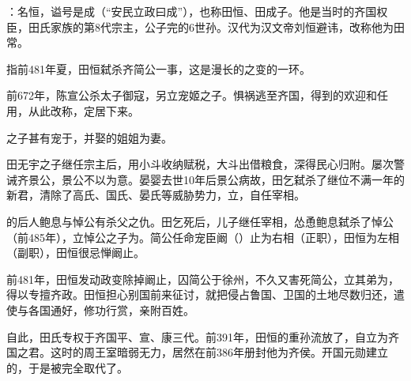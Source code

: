 {
\item {}：名恒，谥号是成（“安民立政曰成”），也称田恒、田成子。他是当时的齐国权臣，田氏家族的第8代宗主，公子完的6世孙。汉代为汉文帝刘恒避讳，改称他为田常。

指前481年夏，田恒弑杀齐简公一事，这是漫长的之变的一环。
\begin{lyenumerate}
\item 前672年，陈宣公杀太子御寇，另立宠姬之子。惧祸逃至齐国，得到的欢迎和任用，从此改称，定居下来。
\item {}之子甚有宠于，并娶的姐姐为妻。%
\item 田无宇之子继任宗主后，用小斗收纳赋税，大斗出借粮食，深得民心归附。屡次警诫齐景公，景公不以为意。晏婴去世10年后景公病故，田乞弑杀了继位不满一年的新君，清除了高氏、国氏、晏氏等威胁势力，立，自任宰相。
\item {}的后人鲍息与悼公有杀父之仇。田乞死后，儿子继任宰相，怂恿鲍息弑杀了悼公（前485年），立悼公之子为。简公任命宠臣阚（）止为右相（正职），田恒为左相（副职），田恒很忌惮阚止。
\item 前481年，田恒发动政变除掉阚止，囚简公于徐州，不久又害死简公，立其弟为，得以专擅齐政。田恒担心别国前来征讨，就把侵占鲁国、卫国的土地尽数归还，遣使与各国通好，修功行赏，亲附百姓。
\item 自此，田氏专权于齐国平、宣、康三代。前391年，田恒的重孙流放了，自立为齐国之君。这时的周王室暗弱无力，居然在前386年册封他为齐侯。开国元勋建立的，于是被完全取代了。
\end{lyenumerate}

}

